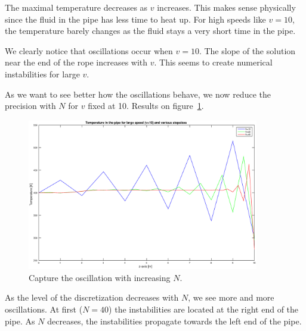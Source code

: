 \documentclass[11pt,a4paper]{report}
\begin{document}
The maximal temperature decreases as $v$ increases. This makes sense physically since the fluid in the pipe has less time to heat up. For high speeds like $v=10$, the temperature barely changes as the fluid stays a very short time in the pipe.

We clearly notice that oscillations occur when $v=10$. 
The slope of the solution near the end of the rope increases with $v$. This seems to create numerical instabilities for large $v$.


As we want to see better how the oscillations behave, we now reduce the precision with $N$ for $v$ fixed at 10. Results on figure~\ref{fig:3}.

\begin{figure}[!h]
\centering
\includegraphics[width = 0.9\textwidth]{./fig3.eps}
\caption{Capture the oscillation with increasing $N$.}
\label{fig:3}
\end{figure}

As the level of the discretization decreases with $N$, we see more and more oscillations. At first ($N=40$) the instabilities are located at the right end of the pipe. As $N$ decreases, the instabilities propagate towards the left end of the pipe.
\end{document}
